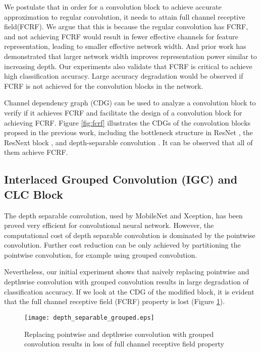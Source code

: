 \documentclass[10pt,twocolumn,letterpaper]{article}
\begin{document}
We postulate that in order for a convolution block to achieve accurate approximation to regular convolution, it needs to attain full channel receptive field(FCRF). We argue that this is because the regular convolution has FCRF, and not achieving FCRF would result in fewer effective channels for  feature representation, leading to smaller effective network width. And prior work\cite{wideresnet2016Zagoruyko} has demonstrated that larger network width improves representation power similar to increasing depth. Our experiments also validate that FCRF is critical to achieve high classification accuracy. Large accuracy degradation would be observed if FCRF is not achieved for the convolution blocks in the network.

Channel dependency graph (CDG) can be used to analyze a convolution block to verify if it achieves FCRF and facilitate the design of a convolution block for achieving FCRF.  Figure \ref{fig:fcrf} illustrates the CDGs of the convolution blocks propsed in the previous work, including the bottleneck structure in ResNet \cite{resnet2016he},  the ResNext block \cite{resnext2016saining}, and depth-separable convolution \cite{mobilenet2017howard}. It can be observed that all of them achieve FCRF.

\subsection{Interlaced Grouped Convolution (IGC) and CLC Block}

The depth separable convolution, used by MobileNet\cite{mobilenet2017howard} and Xception\cite{xception2017chollet}, has been proved very efficient for convolutional neural network. However, the computational cost of depth separable convolution is dominated by the pointwise convolution. Further cost reduction can be only achieved by partitioning the pointwise convolution, for example using grouped convolution.

Nevertheless, our initial experiment shows that naively replacing pointwise and depthwise convolution with grouped convolution results in large degradation of classification accuracy. If we look at the CDG of the modified block, it is evident that the full channel receptive field (FCRF) property is lost (Figure \ref{fig:lost_FCRF}).

\begin{figure}[t!]
\begin{center}
\texttt{[image: depth\_separable\_grouped.eps]}
\end{center}
   \caption{Replacing pointwise and depthwise convolution with grouped convolution results in loss of full channel receptive field property}
\label{fig:lost_FCRF}
\end{figure}
\end{document}
